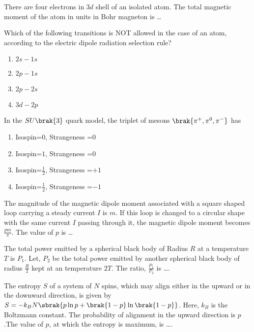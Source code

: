  \iffalse
\chapter{2016}
\author{EE24BTECH11021 - Eshan Ray}
\section{ph}
\fi
    \item There are four electrons in $3d$ shell of an isolated atom. The total magnetic moment of the atom in units in Bohr magneton is \dots
    \item Which of the following transitions is NOT allowed in the case of an atom, according to the electric dipole radiation selection rule?
    \begin{enumerate}
        \item $2s-1s$
        \item $2p-1s$
        \item $2p-2s$
        \item $3d-2p$
    \end{enumerate}
    \item In the $SU\brak{3}$ quark model, the triplet of mesons $\brak{\pi^+,\pi^0,\pi^-}$ has
    \begin{enumerate}
        \item Isospin=$0$, Strangeness =$0$
        \item Isospin=$1$, Strangeness =$0$
        \item Isospin=$\frac{1}{2}$, Strangeness =$+1$
        \item Isospin=$\frac{1}{2}$, Strangeness =$-1$
    \end{enumerate}
    \item The magnitude of the magnetic dipole moment associated with a square shaped loop carrying a steady current $I$ is $m$. If this loop is changed to a circular shape with the same current $I$ passing through it, the magnetic dipole moment becomes $\frac{pm}{\pi}$. The value of $p$ is \dots
    \item The total power emitted by a spherical black body of Radius $R$ at a temperature $T$ is $P_1$. Let, $P_2$ be the total power emitted by another spherical black body  of radius $\frac{R}{2}$ kept at an temperature $2T$. The ratio, $\frac{P_1}{P_2}$ is \dots. 
    \item The entropy $S$ of a system of $N$ spins, which may align either in the upward or in the downward direction, is given by $S=-k_BN\sbrak{p\ln{p}+\brak{1-p}\ln\brak{1-p}}$. Here, $k_B$ is the Boltzmann constant. The probability of alignment in the upward direction is $p$ .The value of $p$, at which the entropy is maximum, is \dots. 
